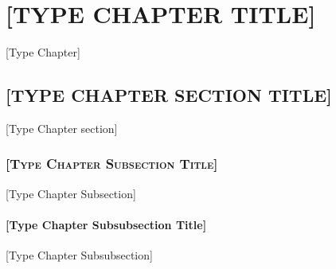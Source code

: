 \chapter{\MakeUppercase{[Type Chapter Title]}}
[Type Chapter]
\section{\MakeUppercase{[Type Chapter Section Title]}}
[Type Chapter section]
\subsection{\textsc{[Type Chapter Subsection Title]}}
[Type Chapter Subsection]
\subsubsection{[Type Chapter Subsubsection Title]}
[Type Chapter Subsubsection]